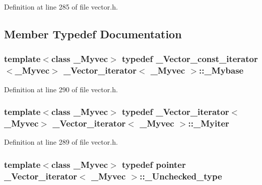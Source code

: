 Definition at line 285 of file vector.\+h.



\subsection{Member Typedef Documentation}
\hypertarget{class___vector__iterator_a62a662bae2cce37b78e1b581c15b2d2f}{
\subsubsection[{\+\_\+\+Mybase}]{\setlength{\rightskip}{0pt plus 5cm}template$<$class \+\_\+\+Myvec$>$ typedef {\bf \+\_\+\+Vector\+\_\+const\+\_\+iterator}$<$\+\_\+\+Myvec$>$ {\bf \+\_\+\+Vector\+\_\+iterator}$<$ \+\_\+\+Myvec $>$\+::{\bf \+\_\+\+Mybase}}}\label{class___vector__iterator_a62a662bae2cce37b78e1b581c15b2d2f}


Definition at line 290 of file vector.\+h.

\hypertarget{class___vector__iterator_a207a91d767f8b7b96d0b375b9dbc8731}{
\subsubsection[{\+\_\+\+Myiter}]{\setlength{\rightskip}{0pt plus 5cm}template$<$class \+\_\+\+Myvec$>$ typedef {\bf \+\_\+\+Vector\+\_\+iterator}$<$\+\_\+\+Myvec$>$ {\bf \+\_\+\+Vector\+\_\+iterator}$<$ \+\_\+\+Myvec $>$\+::{\bf \+\_\+\+Myiter}}}\label{class___vector__iterator_a207a91d767f8b7b96d0b375b9dbc8731}


Definition at line 289 of file vector.\+h.

\hypertarget{class___vector__iterator_a9707cfb9b3706ab297a178e6afeaae9b}{
\subsubsection[{\+\_\+\+Unchecked\+\_\+type}]{\setlength{\rightskip}{0pt plus 5cm}template$<$class \+\_\+\+Myvec$>$ typedef {\bf pointer} {\bf \+\_\+\+Vector\+\_\+iterator}$<$ \+\_\+\+Myvec $>$\+::{\bf \+\_\+\+Unchecked\+\_\+type}}}\label{class___vector__iterator_a9707cfb9b3706ab297a178e6afeaae9b}


